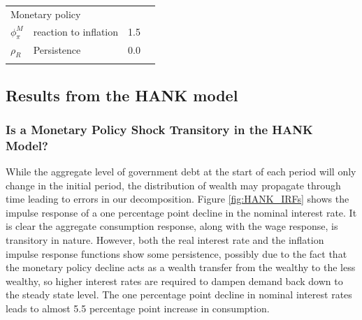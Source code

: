 \documentclass[12pt,a4paper]{article}
\begin{document}
\begin{table}[!htbp]
\begin{threeparttable}
\begin{adjustbox}{width=13.5cm, totalheight=9cm}
\begin{tabular}{l l r c}
\multicolumn{2}{l}{Monetary policy}\\
$\phi_{\pi}^M$ & reaction to inflation & 1.5  \\
$\rho_R$ & Persistence & 0.0 \\
\addlinespace[4pt]


\bottomrule

\end{tabular}
\end{adjustbox}
\end{threeparttable}

\label{table:calibration} 

\end{table}

\subsection{Results from the HANK model}

\subsubsection{Is a Monetary Policy Shock Transitory in the HANK Model?}
While the aggregate level of government debt at the start of each period will only change in the initial period, the distribution of wealth may propagate through time leading to errors in our decomposition. Figure \ref{fig:HANK_IRFs} shows the impulse response of a one percentage point decline in the nominal interest rate. It is clear the aggregate consumption response, along with the wage response, is transitory in nature. However, both the real interest rate and the inflation impulse response functions show some persistence, possibly due to the fact that the monetary policy decline acts as a wealth transfer from the wealthy to the less wealthy, so higher interest rates are required to dampen demand back down to the steady state level. The one percentage point decline in nominal interest rates leads to almost 5.5 percentage point increase in consumption. 
\end{document}
